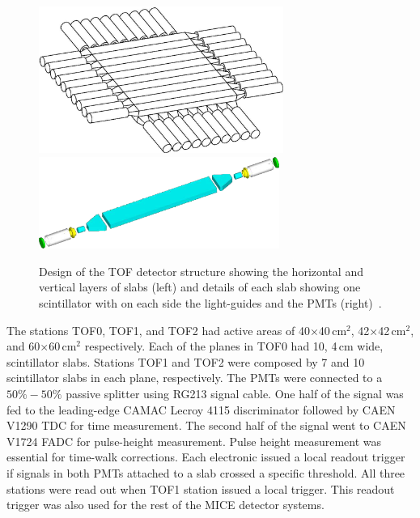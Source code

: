 \begin{figure}[!ht]
  \centering
  \includegraphics[width=8cm]{tof_diagram2}
  \includegraphics[height=3cm]{slab_design2}
  \caption{Design of the TOF detector structure showing the horizontal and vertical layers of slabs (left) and details of each slab showing one scintillator with on each side the light-guides and the PMTs (right)~\cite{NOTE145}.}
  \label{fig:tof:schematic}
\end{figure}

The stations TOF0, TOF1, and TOF2 had active areas of
40$\times$40\,cm$^2$, 42$\times$42\,cm$^2$, and 60$\times$60\,cm$^2$
respectively.  Each of the planes in TOF0 had 10, 4\,cm wide, scintillator slabs.
Stations TOF1 and TOF2 were composed by 7 and 10 scintillator slabs in each plane, respectively.
The PMTs were connected to a $50\%-50\%$ passive splitter using RG213 signal cable. One half of the signal was fed to
the leading-edge CAMAC Lecroy 4115 discriminator followed by CAEN
V1290 TDC for time measurement. The second half of the signal went to
CAEN V1724 FADC for pulse-height measurement. Pulse height
measurement was essential for time-walk corrections. Each electronic
issued a local readout trigger if signals in both PMTs attached to a
slab crossed a specific threshold. All three stations were read out when
TOF1 station issued a local trigger. This readout trigger was also
used for the rest of the MICE detector systems.


